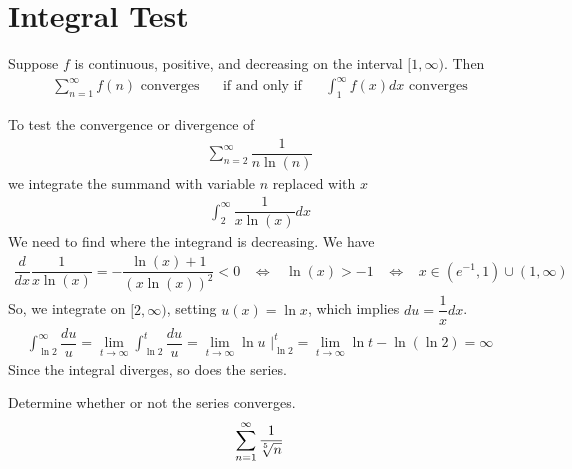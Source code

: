 \section{Integral Test}

\begin{theorem}
Suppose $f$ is continuous, positive, and decreasing on the interval $[1, \infty)$. Then
\begin{align*}
    \sum_{n=1}^{\infty} f(n) \hspace{4pt} \text{converges} \hspace{20pt} \text{if and only if} \hspace{20pt} \int_{1}^{\infty} f(x) dx \hspace{4pt} \text{converges}
\end{align*}
\end{theorem}

\begin{example}
To test the convergence or divergence of 
\begin{align*}
    \sum_{n=2}^{\infty} \dfrac{1}{n \ln (n)}
\end{align*}
we integrate the summand with variable $n$ replaced with $x$
\begin{align*}
    \int_{2}^{\infty} \dfrac{1}{x \ln (x)} dx 
\end{align*}
We need to find where the integrand is decreasing. We have
\begin{align*}
    \dfrac{d}{dx} \dfrac{1}{x \ln (x)} = -\dfrac{\ln (x) + 1}{(x \ln (x))^{2}} < 0 \hspace{10pt} \Longleftrightarrow \hspace{10pt} \ln (x) > -1 \hspace{10pt} \Longleftrightarrow \hspace{10pt} x \in (e^{-1}, 1) \cup (1, \infty)
\end{align*}
So, we integrate on $[2, \infty)$, setting $u(x) = \ln x$, which implies $du = \dfrac{1}{x} dx$.
\begin{align*}
    \int_{\ln 2}^{\infty} \dfrac{du}{u} = \lim_{t \longrightarrow \infty} \int_{\ln 2}^{t} \dfrac{du}{u} = \lim_{t \longrightarrow \infty} \ln u \hspace{4pt} \Big|_{\ln 2}^{t} = \lim_{t \longrightarrow \infty} \ln t - \ln(\ln 2) = \infty
\end{align*}
Since the integral diverges, so does the series.
\end{example}

\begin{exercise}
Determine whether or not the series converges.
\begin{align*}
    \sum_{n=1}^{\infty} \dfrac{1}{\sqrt[\leftroot{2}\uproot{2}5]{n}}
\end{align*}
\end{exercise}

